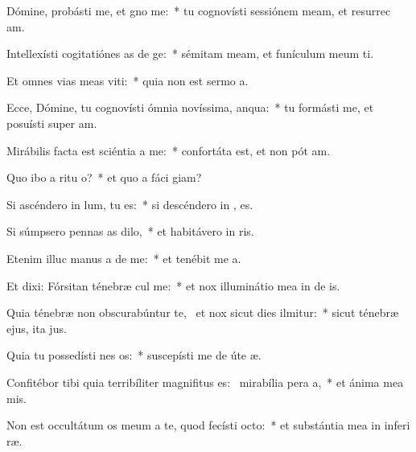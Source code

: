 \item Dómine, probásti me, et gno me:~* tu cognovísti sessiónem meam, et resurrec am.
\item Intellexísti cogitatiónes as de ge:~* sémitam meam, et funículum meum ti.
\item Et omnes vias meas viti:~* quia non est sermo   a.
\item Ecce, Dómine, tu cognovísti ómnia novíssima,  anqua:~* tu formásti me, et posuísti super   am.
\item Mirábilis facta est sciéntia a  me:~* confortáta est, et non pót  am.
\item Quo ibo a ritu o?~* et quo a fáci  giam?
\item Si ascéndero in lum, tu  es:~* si descéndero in , es.
\item Si súmpsero pennas as dilo,~* et habitávero in  ris.
\item Etenim illuc manus a de me:~* et tenébit me  a.
\item Et dixi: Fórsitan ténebræ cul me:~* et nox illuminátio mea in de is.
\item Quia ténebræ non obscurabúntur  te,~\pscross{} et nox sicut dies ilmitur:~* sicut ténebræ ejus, ita   jus.
\item Quia tu possedísti nes os:~* suscepísti me de úte  æ.
\item Confitébor tibi quia terribíliter magnifitus es:~\pscross{} mirabília pera a,~* et ánima mea  mis.
\item Non est occultátum os meum a te, quod fecísti  octo:~* et substántia mea in inferi ræ.
